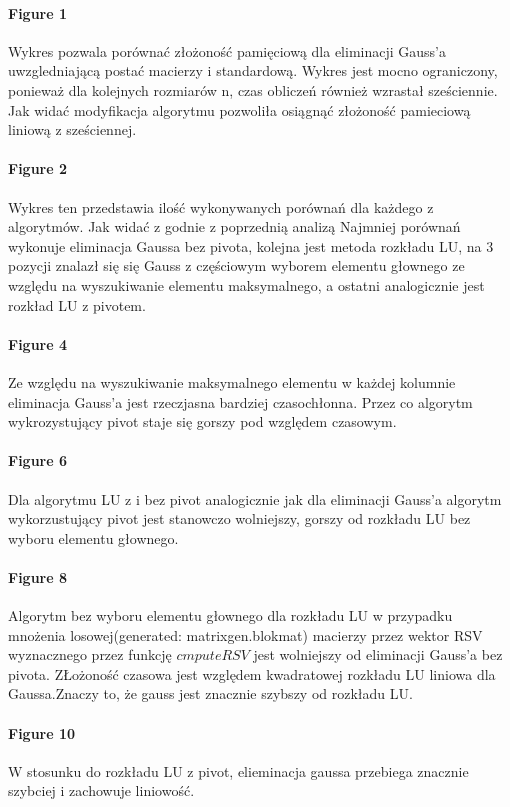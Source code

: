 \documentclass[11pt]{article}
\begin{document}
\begin{flushleft}
\begin{flushleft}
\paragraph{Figure 1}
Wykres pozwala porównać złożoność pamięciową dla eliminacji Gauss'a uwzgledniającą postać macierzy i standardową. Wykres jest mocno ograniczony, ponieważ dla kolejnych rozmiarów n, czas obliczeń również wzrastał sześciennie. Jak widać modyfikacja algorytmu pozwoliła osiągnąć złożoność pamieciową liniową z sześciennej.
\paragraph{Figure 2}
Wykres ten przedstawia ilość wykonywanych porównań dla każdego z algorytmów. Jak widać z godnie z poprzednią analizą Najmniej porównań wykonuje eliminacja Gaussa bez pivota, kolejna jest metoda rozkładu LU, na 3 pozycji znalazł się się Gauss z częściowym wyborem elementu głownego ze względu na wyszukiwanie elementu maksymalnego, a ostatni analogicznie jest rozkład LU z pivotem.
\paragraph{Figure 4}
Ze względu na wyszukiwanie maksymalnego elementu w każdej kolumnie eliminacja Gauss'a jest rzeczjasna bardziej czasochłonna. Przez co algorytm wykrozystujący pivot staje się gorszy pod względem czasowym.
\paragraph{Figure 6}
Dla algorytmu LU z i bez pivot analogicznie jak dla eliminacji Gauss'a algorytm wykorzustujący pivot jest stanowczo wolniejszy, gorszy od rozkładu LU bez wyboru elementu głownego.
\paragraph{Figure 8}
Algorytm bez wyboru elementu głownego dla rozkładu LU w przypadku mnożenia losowej(generated: matrixgen.blokmat) macierzy przez wektor RSV wyznacznego przez funkcję $cmputeRSV$  jest wolniejszy od eliminacji Gauss'a bez pivota. ZŁożoność czasowa jest względem kwadratowej rozkładu LU liniowa dla Gaussa.Znaczy to, że gauss jest znacznie szybszy od rozkładu LU.
\paragraph{Figure 10}
W stosunku do rozkładu LU z pivot, elieminacja gaussa przebiega znacznie szybciej i zachowuje liniowość.

\end{flushleft}
\end{flushleft}
\end{document}
